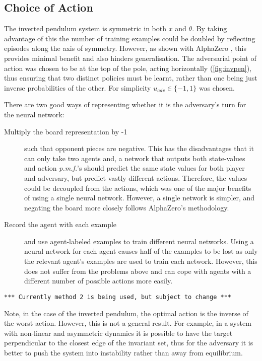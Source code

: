 \documentclass[../main.tex]{subfiles}
\begin{document}
\subsection{Choice of Action}

The inverted pendulum system is symmetric in both $x$ and $\theta$. By taking advantage of this the number of training examples could be doubled by reflecting episodes along the axis of symmetry. However, as shown with AlphaZero \cite{AlphaZero}, this provides minimal benefit and also hinders generalisation. The adversarial point of action was chosen to be at the top of the pole, acting horizontally (\cref{fig:invpen}), thus ensuring that two distinct policies must be learnt, rather than one being just inverse probabilities of the other. For simplicity $u_{adv} \in \{-1, 1\}$ was chosen.

There are two good ways of representing whether it is the adversary's turn for the neural network: 
\begin{description}
   \item[Multiply the board representation by -1] such that opponent pieces are negative. This has the disadvantages that it can only take two agents and, a network that outputs both state-values and action \textit{p.m.f.}'s should predict the same state values for both player and adversary, but predict vastly different actions. Therefore, the values could be decoupled from the actions, which was one of the major benefits of using a single neural network. However, a single network is simpler, and negating the board more closely follows AlphaZero's methodology.

   \item[Record the agent with each example] and use agent-labeled examples to train different neural networks. Using a neural network for each agent causes half of the examples to be lost as only the relevant agent's examples are used to train each network. However, this does not suffer from the problems above and can cope with agents with a different number of possible actions more easily.
\end{description}

\texttt{*** Currently method 2 is being used, but subject to change ***}

Note, in the case of the inverted pendulum, the optimal action is the inverse of the worst action. However, this is not a general result. For example, in a system with non-linear and asymmetric dynamics it is possible to have the target perpendicular to the closest edge of the invariant set, thus for the adversary it is better to push the system into instability rather than away from equilibrium.
\end{document}
